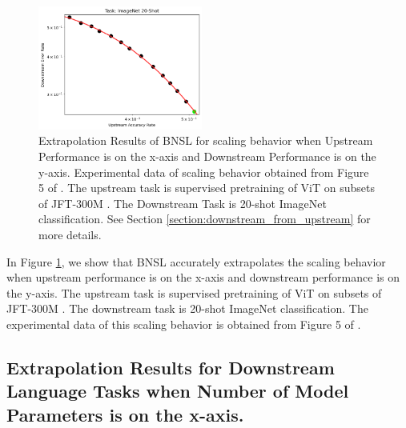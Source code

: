 \documentclass{article} %
\begin{document}
\begin{figure}[htbp]
    \centering
\includegraphics[width=0.48\textwidth]{figures/downstream_from_upstream/Task_ImageNet_20-shot.png}

    \caption{
    Extrapolation Results of BNSL for scaling behavior when Upstream Performance is on the x-axis and Downstream Performance is on the y-axis. Experimental data of scaling behavior obtained from Figure 5 of \cite{abnar2021exploring}. The upstream task is supervised pretraining of ViT \citep{dosovitskiy2020image} on subsets of JFT-300M \citep{sun2017revisiting}. The Downstream Task is 20-shot ImageNet classification. See Section \ref{section:downstream_from_upstream} for more details.
    }
    \label{fig:downstream_from_upstream}
\end{figure}

In Figure \ref{fig:downstream_from_upstream}, we show that BNSL accurately extrapolates the scaling behavior when upstream performance is on the x-axis and downstream performance is on the y-axis. The upstream task is supervised pretraining of ViT \citep{dosovitskiy2020image} on subsets of JFT-300M \citep{sun2017revisiting}. The downstream task is 20-shot ImageNet classification. The experimental data of this scaling behavior is obtained from Figure 5 of \cite{abnar2021exploring}.

\FloatBarrier

\iffalse

\subsection{Extrapolation Results for Downstream Language Tasks when Number of Model Parameters is on the x-axis.}
\label{section:language_tasks__number_of_parameters}
\end{document}
